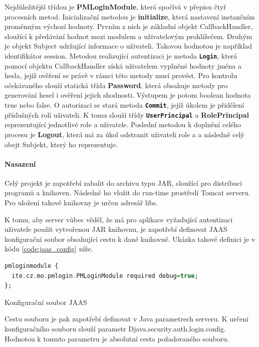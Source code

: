 \documentclass[thesis=M,czech]{FITthesis}[2012/06/26]
\begin{document}
Nejdůležitější třídou je \textbf{PMLoginModule}, která spočívá v přepisu čtyř procesních metod. Inicializační metodou je \textbf{initialize}, která nastavení instančním proměnným výchozí hodnoty. Prvním z nich je základní objekt CallbackHandler, sloužící k předávání hodnot mezi modulem a uživatelovým prohlížečem. Druhým je objekt Subject udržující informace o uživateli. Takovou hodnotou je například identifikátor session. Metodou realizující autentizaci je metoda \texttt{\textbf{Login}}, která pomocí objektu CallbackHandler získá uživatelem vyplněné hodnoty jména a hesla, jejíž ověření se právě v rámci této metody musí provést. Pro kontrolu očekávaného slouží statická třída \textbf{Password}, která obsahuje metody pro generování hesel i ověření jejich shodnosti. Výstupem je potom boolean hodnota true nebo false. O autorizaci se stará metoda \texttt{\textbf{Commit}}, jejíž úkolem je přidělení příslušných rolí uživateli. K tomu slouží třídy \texttt{\textbf{UserPrincipal}} a \textbf{RolePrincipal} reprezentující jednotlivé role a uživatele. Poslední metodou k doplnění celého procesu je \textbf{Logout}, která má za úkol odstranit uživateli role a a následně celý obejt Subjekt, který ho reprezentuje.

\paragraph{Nasazení} Celý projekt je zapotřebí zabalit do archivu typu JAR, sloužící pro distribuci programů a knihoven. Následně ho vložit do run-time prostředí Tomcat serveru. Pro uložení takové knihovny je určen adresář libs.

K tomu, aby server vůbec věděl, že má pro aplikace vyžadující autentizaci uživatele použít vytvořenou JAR knihovnu, je zapotřebí definovat JAAS konfigurační soubor obsahující cestu k dané knihovně. Ukázka takové definici je v kódu \ref{code:jaas_config} níže. 

\begin{algorithm}[H]	
	\begin{lstlisting}[language = VHDL]  
pmloginmodule {
  ite.cz.mo.pmlogin.PMLoginModule required debug=true;
};
	\end{lstlisting}
	\caption{Konfigurační soubor JAAS}	
	\label{code:jaas_config}
\end{algorithm}	

Cestu souboru je pak zapotřebí definovat v Java parametrech serveru. K určení konfiguračního souboru slouží parametr Djava.security.auth.login.config. Hodnotou k tomuto parametru je absolutní cesta požadovaného souboru.
\end{document}
